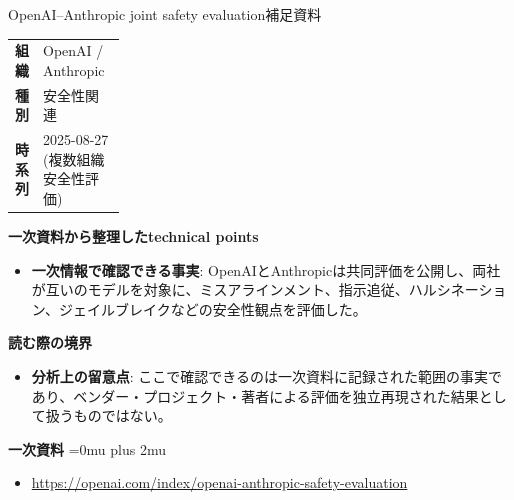 \begin{technicalnote}{OpenAI–Anthropic joint safety evaluation}{補足資料}
\begingroup
\begin{tabularx}{\linewidth}{@{}>{\bfseries}p{0.22\linewidth}X@{}}
組織 & OpenAI / Anthropic \\
種別 & 安全性関連 \\
時系列 & 2025-08-27 (複数組織安全性評価) \\
\end{tabularx}
\smallskip
{\bfseries 一次資料から整理したtechnical points}
\begin{itemize}[leftmargin=1.5em,itemsep=0.35em]
\item \textbf{一次情報で確認できる事実}: OpenAIとAnthropicは共同評価を公開し、両社が互いのモデルを対象に、ミスアラインメント、指示追従、ハルシネーション、ジェイルブレイクなどの安全性観点を評価した。
\end{itemize}
\begin{minipage}{\linewidth}
{\bfseries 読む際の境界}
\begin{itemize}[leftmargin=1.5em,itemsep=0.35em]
\item \textbf{分析上の留意点}: ここで確認できるのは一次資料に記録された範囲の事実であり、ベンダー・プロジェクト・著者による評価を独立再現された結果として扱うものではない。
\end{itemize}
\begin{samepage}
{\bfseries 一次資料}
\begingroup\sloppy
\Urlmuskip=0mu plus 2mu\relax
\begin{itemize}[leftmargin=1.5em,itemsep=0.25em]
\item {\scriptsize\url{https://openai.com/index/openai-anthropic-safety-evaluation}}
\end{itemize}
\endgroup
\end{samepage}
\end{minipage}
\endgroup
\end{technicalnote}
\medskip
